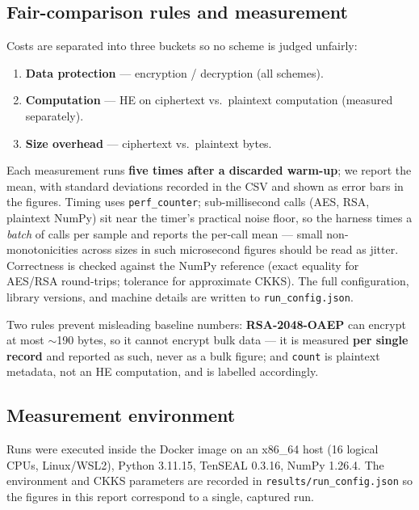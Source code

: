\documentclass[11pt,a4paper]{article}
\begin{document}
\subsection{Fair-comparison rules and measurement}

Costs are separated into three buckets so no scheme is judged unfairly:
\begin{enumerate}[leftmargin=1.4em,itemsep=1pt]
  \item \textbf{Data protection} --- encryption / decryption (all schemes).
  \item \textbf{Computation} --- HE on ciphertext vs.\ plaintext computation
    (measured separately).
  \item \textbf{Size overhead} --- ciphertext vs.\ plaintext bytes.
\end{enumerate}

Each measurement runs \textbf{five times after a discarded warm-up}; we report
the mean, with standard deviations recorded in the CSV and shown as error bars in
the figures. Timing uses \texttt{perf\_counter}; sub-millisecond calls (AES, RSA,
plaintext NumPy) sit near the timer's practical noise floor, so the harness times
a \emph{batch} of calls per sample and reports the per-call mean --- small
non-monotonicities across sizes in such microsecond figures should be read as
jitter. Correctness is checked against the NumPy reference (exact equality for
AES/RSA round-trips; tolerance for approximate CKKS). The full configuration,
library versions, and machine details are written to \texttt{run\_config.json}.

Two rules prevent misleading baseline numbers: \textbf{RSA-2048-OAEP} can encrypt
at most $\sim$190 bytes, so it cannot encrypt bulk data --- it is measured
\textbf{per single record} and reported as such, never as a bulk figure; and
\texttt{count} is plaintext metadata, not an HE computation, and is labelled
accordingly.

\subsection{Measurement environment}

Runs were executed inside the Docker image on an x86\_64 host (16 logical CPUs,
Linux/WSL2), Python 3.11.15, TenSEAL 0.3.16, NumPy 1.26.4. The environment and
CKKS parameters are recorded in \texttt{results/run\_config.json} so the figures
in this report correspond to a single, captured run.

\end{document}

